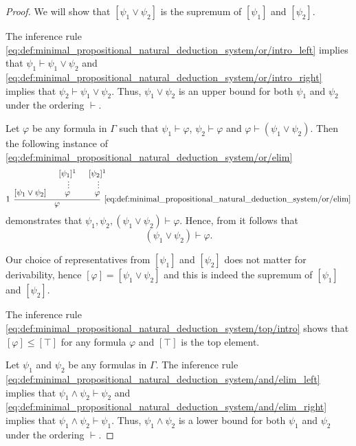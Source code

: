 \begin{proof}
   We will show that \( [\psi_1 \vee \psi_2] \) is the supremum of \( [\psi_1] \) and \( [\psi_2] \).

  The inference rule \eqref{eq:def:minimal_propositional_natural_deduction_system/or/intro_left} implies that \( \psi_1 \vdash \psi_1 \vee \psi_2 \) and \eqref{eq:def:minimal_propositional_natural_deduction_system/or/intro_right} implies that \( \psi_2 \vdash \psi_1 \vee \psi_2 \). Thus, \( \psi_1 \vee \psi_2 \) is an upper bound for both \( \psi_1 \) and \( \psi_2 \) under the ordering \( \vdash \).

  Let \( \varphi \) be any formula in \( \Gamma \) such that \( \psi_1 \vdash \varphi \), \( \psi_2 \vdash \varphi \) and \( \varphi \vdash (\psi_1 \vee \psi_2) \). Then the following instance of \eqref{eq:def:minimal_propositional_natural_deduction_system/or/elim}
  \begin{equation*}
    \begin{prooftree}
      \hypo{ [\psi_1 \vee \psi_2] }
      \hypo{ [\psi_1]^1 }
      \ellipsis {} { \varphi }
      \hypo{ [\psi_2]^1 }
      \ellipsis {} { \varphi }
      \infer[left label=\( 1 \)]3[\ref{eq:def:minimal_propositional_natural_deduction_system/or/elim}]{ \varphi }
    \end{prooftree}
  \end{equation*}
  demonstrates that \( \psi_1, \psi_2, (\psi_1 \vee \psi_2) \vdash \varphi \). Hence, from  it follows that
  \begin{equation*}
    (\psi_1 \vee \psi_2) \vdash \varphi.
  \end{equation*}

  Our choice of representatives from \( [\psi_1] \) and \( [\psi_2] \) does not matter for derivability, hence \( [\varphi] = [\psi_1 \vee \psi_2] \) and this is indeed the supremum of \( [\psi_1] \) and \( [\psi_2] \).

   The inference rule \eqref{eq:def:minimal_propositional_natural_deduction_system/top/intro} shows that \( [\varphi] \leq [\top] \) for any formula \( \varphi \) and \( [\top] \) is the top element.

   Let \( \psi_1 \) and \( \psi_2 \) be any formulas in \( \Gamma \). The inference rule \eqref{eq:def:minimal_propositional_natural_deduction_system/and/elim_left} implies that \( \psi_1 \wedge \psi_2 \vdash \psi_2 \) and \eqref{eq:def:minimal_propositional_natural_deduction_system/and/elim_right} implies that \( \psi_1 \wedge \psi_2 \vdash \psi_1 \). Thus, \( \psi_1 \wedge \psi_2 \) is a lower bound for both \( \psi_1 \) and \( \psi_2 \) under the ordering \( \vdash \).


\end{proof}
